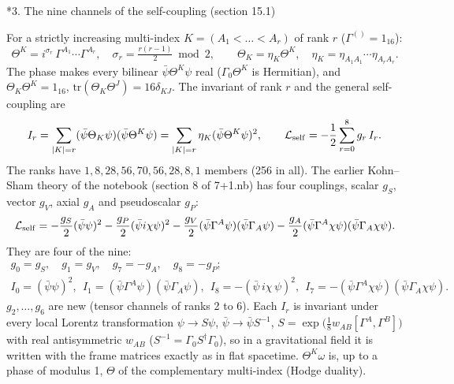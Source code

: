 \documentclass[10pt,a4paper]{article}
\makeatletter
\renewcommand\section{\@startsection{section}{1}{\z@}{-3.5ex \@plus -1ex \@minus -.2ex}{2.3ex \@plus.2ex}{\normalfont\Large\bfseries\raggedright}}
\makeatother
\begin{document}
\section*{3. The nine channels of the self-coupling (section 15.1)}
For a strictly increasing multi-index $K=(A_1<\dots<A_r)$ of rank $r$ ($\Gamma^{()}=1_{16}$):
\begin{equation*}
\Theta^K=i^{\sigma_r}\,\Gamma^{A_1}\cdots\Gamma^{A_r},\quad \sigma_r=\tfrac{r(r-1)}{2}\bmod 2,\qquad \Theta_K=\eta_K\Theta^K,\quad \eta_K=\eta_{A_1A_1}\cdots\eta_{A_rA_r}.
\end{equation*}
The phase makes every bilinear $\bar\psi\Theta^K\psi$ real ($\Gamma_0\Theta^K$ is Hermitian), and $\Theta_K\Theta^K=1_{16}$, $\mathrm{tr}(\Theta_K\Theta^J)=16\delta_{KJ}$. The invariant of rank $r$ and the general self-coupling are
\begin{equation*}
I_r=\sum_{|K|=r}(\bar\psi\Theta_K\psi)(\bar\psi\Theta^K\psi)=\sum_{|K|=r}\eta_K(\bar\psi\Theta^K\psi)^2,\qquad \mathcal L_{\rm self}=-\frac12\sum_{r=0}^{8}g_r\,I_r .
\end{equation*}
The ranks have $1,8,28,56,70,56,28,8,1$ members (256 in all). The earlier Kohn–Sham theory of the notebook (section 8 of 7+1.nb) has four couplings, scalar $g_S$, vector $g_V$, axial $g_A$ and pseudoscalar $g_P$:
\begin{equation*}
\mathcal L_{\rm self}=-\frac{g_S}2(\bar\psi\psi)^2-\frac{g_P}2(\bar\psi i\chi\psi)^2-\frac{g_V}2(\bar\psi\Gamma^A\psi)(\bar\psi\Gamma_A\psi)-\frac{g_A}2(\bar\psi\Gamma^A\chi\psi)(\bar\psi\Gamma_A\chi\psi).
\end{equation*}
They are four of the nine:
\begin{gather*}
g_0=g_S,\quad g_1=g_V,\quad g_7=-g_A,\quad g_8=-g_P;\\ I_0=(\bar\psi\psi)^2,\ \ I_1=(\bar\psi\Gamma^A\psi)(\bar\psi\Gamma_A\psi),\ \ I_8=-(\bar\psi\,i\chi\,\psi)^2,\ \ I_7=-(\bar\psi\Gamma^A\chi\psi)(\bar\psi\Gamma_A\chi\psi).
\end{gather*}
$g_2,\dots,g_6$ are new (tensor channels of ranks 2 to 6). Each $I_r$ is invariant under every local Lorentz transformation $\psi\to S\psi$, $\bar\psi\to\bar\psi S^{-1}$, $S=\exp\big(\tfrac18w_{AB}[\Gamma^A,\Gamma^B]\big)$ with real antisymmetric $w_{AB}$ ($S^{-1}=\Gamma_0S^\dagger\Gamma_0$), so in a gravitational field it is written with the frame matrices exactly as in flat spacetime. $\Theta^K\omega$ is, up to a phase of modulus 1, $\Theta$ of the complementary multi-index (Hodge duality).
\end{document}
